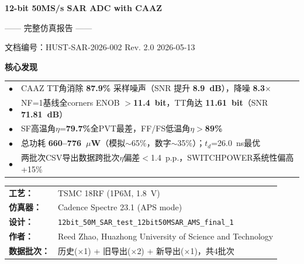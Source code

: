 \documentclass[11pt,a4paper,UTF8]{ctexart}
\begin{document}
\begin{titlepage}
\thispagestyle{empty}
\begin{center}
\vspace*{2cm}

{\LARGE\bfseries\color{primaryblue}12-bit 50MS/s SAR ADC with CAAZ}

\vspace{0.3cm}
{\large —— 完整仿真报告 ——}

\vspace{1cm}

{\small 文档编号：HUST-SAR-2026-002 \hspace{2em} Rev. 2.0 \hspace{2em} 2026-05-13}

\vspace{1.5cm}

\begin{tcolorbox}[colback=accentblue,colframe=primaryblue,sharp corners]
\centering
\textbf{\large\color{primaryblue}核心发现}
\vspace{4pt}
\small
\begin{tabular}{ll}
\color{primaryblue}$\bullet$ & \color{black}CAAZ TT角消除 \textbf{87.9\%} 采样噪声（SNR 提升 \textbf{8.9~dB}），降噪 \textbf{8.3$\times$} \\
\color{primaryblue}$\bullet$ & \color{black}NF=1基线全corners ENOB $>$\textbf{11.4~bit}，TT角达 \textbf{11.61~bit}（SNR \textbf{71.81~dB}） \\
\color{primaryblue}$\bullet$ & \color{black}SF高温角$\eta$=\textbf{79.7\%}全PVT最差，FF/FS低温角$\eta>$\textbf{89\%} \\
\color{primaryblue}$\bullet$ & \color{black}总功耗 \textbf{660--776~$\mu$W}（模拟$\sim$65\%，数字$\sim$35\%）；$t_d$=26.0~ns最优 \\
\color{primaryblue}$\bullet$ & \color{black}两批次CSV导出数据跨批次$\eta$偏差$<$1.4~p.p.，SWITCHPOWER系统性偏高+15\% \\
\end{tabular}
\end{tcolorbox}

\vspace{1.5cm}

\begin{tabular}{ll}
\textbf{工艺：} & TSMC 18RF (1P6M, 1.8~V) \\
\textbf{仿真器：} & Cadence Spectre 23.1 (APS mode) \\
\textbf{设计：} & \texttt{12bit\_50M\_SAR\_test\_12bit50MSAR\_AMS\_final\_1} \\
\textbf{作者：} & Reed Zhao, Huazhong University of Science and Technology \\
\textbf{数据批次：} & 历史($\times$1) + 旧导出($\times$2) + 新导出($\times$1)，共4批次 \\
\end{tabular}


\end{center}
\end{titlepage}
\end{document}
